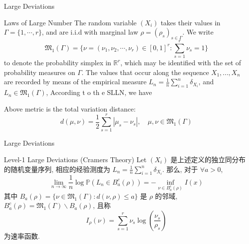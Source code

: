\documentclass{beamer}
\begin{document}
	\begin{frame}{Large Deviations}
		\begin{block}{Laws of Large Number}
            The random variable $\left(\mathit{X}_i \right)$ takes their values in $\Gamma=\{1, \cdots, r\}$, and are i.i.d with marginal law $\rho=(\rho_s)_{s \in \Gamma}$. 
            We write
			$$ 
			\mathfrak{M}_1(\Gamma) = \{\nu = (\nu_1, \nu_2, \cdots, \nu_r)\in [0,1]^r:\sum_{s=1}^r \nu_s = 1\}
            $$ 
            to denote the probability simplex in $\mathbb{R}^r$, which may be identified with the set of probability measures on $\Gamma$.
            The values that occur along the sequence $\mathit{X}_1,..., \mathit{X}_n$ are recorded by means of the empirical measure $\mathit{L}_n = \frac{1}{n}\sum_{i=1}^{n}\delta_{\mathit{X}_i} $, and $\mathit{L}_n \in \mathfrak{M}_1(\Gamma)$, 
			According t o th e SLLN, we have
			\begin{figure}
				\centering
			\end{figure}
			Above metric is the total variation distance:
			$$
			d(\mu, \nu) = \frac{1}{2} \sum_{s=1}^r |\mu_s - \nu_s|, \quad \mu, \nu \in \mathfrak{M}_1(\Gamma)
			$$
		\end{block}
	\end{frame}

	\begin{frame}{Large Deviations}
		\begin{block}{Level-1 Large Deviations (Cramers Theory)}
			Let $(\mathit{X}_i)$ 是上述定义的独立同分布的随机变量序列, 相应的经验测度为 $\mathit{L}_n = \frac{1}{n} \sum_{i=1}^n \delta_{\mathit{X}_i}$. 那么, 对于 $\forall a>0$, 
			$$
			\lim_{n \rightarrow \infty} \frac{1}{n} \log \mathbb{P} \left(\mathit{L}_n \in \mathit{B}_a^c(\rho)\right) = -\inf_{\nu \in \mathit{B}_a^c(\rho)} \mathit{I}(x)
			$$
			其中 $\mathit{B}_a(\rho)=\{\nu \in \mathfrak{M}_1(\Gamma): d(\nu,  \rho) \le a\}$ 是 $\rho$ 的邻域, $\mathit{B}_a^c(\rho) = \mathfrak{M}_1(\Gamma) \backslash  \mathit{B}_a(\rho)$, 且称
			$$
			\mathit{I}_{\rho}(\nu) = \sum_{s=1}^r \nu_s \log \left(\frac{\nu_s}{\rho_s}\right)
			$$
			为速率函数. 
		\end{block}
	\end{frame}
\end{document}
